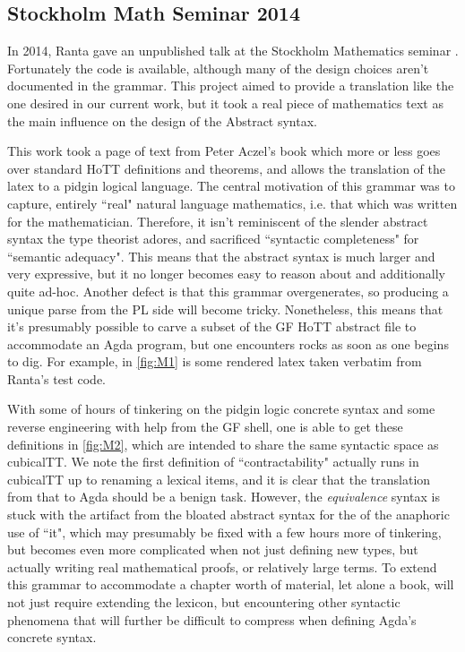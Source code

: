 \subsection{Stockholm Math Seminar 2014}

In 2014, Ranta gave an unpublished talk at the Stockholm Mathematics seminar
\cite{aarneHott}. Fortunately the code is available, although many of the design
choices aren't documented in the grammar. This project aimed to provide a
translation like the one desired in our current work, but it took a real piece
of mathematics text as the main influence on the design of the Abstract syntax.

This work took a page of text from Peter Aczel's book which more or less goes
over standard HoTT definitions and theorems, and allows the translation of the
latex to a pidgin logical language. The central motivation of this grammar was
to capture, entirely ``real" natural language mathematics, i.e. that which was
written for the mathematician. Therefore, it isn't reminiscent of the slender
abstract syntax the type theorist adores, and sacrificed ``syntactic
completeness" for ``semantic adequacy". This means that the abstract syntax is
much larger and very expressive, but it no longer becomes easy to reason about
and additionally quite ad-hoc. Another defect is that this grammar
overgenerates, so producing a unique parse from the PL side will become tricky.
Nonetheless, this means that it's presumably possible to carve a subset of the
GF HoTT abstract file to accommodate an Agda program, but one encounters rocks as soon
as one begins to dig. For example, in \autoref{fig:M1} is some rendered latex
taken verbatim from Ranta's test code.

With some of hours of tinkering on the pidgin logic concrete syntax and some
reverse engineering with help from the GF shell, one is able to get these
definitions in \autoref{fig:M2}, which are intended to share the same syntactic
space as cubicalTT. We note the first definition of ``contractability" actually
runs in cubicalTT up to renaming a lexical items, and it is clear that the
translation from that to Agda should be a benign task. However, the
\emph{equivalence} syntax is stuck with the artifact from the bloated abstract
syntax for the of the anaphoric use of ``it", which may presumably be fixed with
a few hours more of tinkering, but becomes even more complicated when not just
defining new types, but actually writing real mathematical proofs, or relatively
large terms. To extend this grammar to accommodate a chapter worth of material,
let alone a book, will not just require extending the lexicon, but encountering
other syntactic phenomena that will further be difficult to compress when
defining Agda's concrete syntax.

